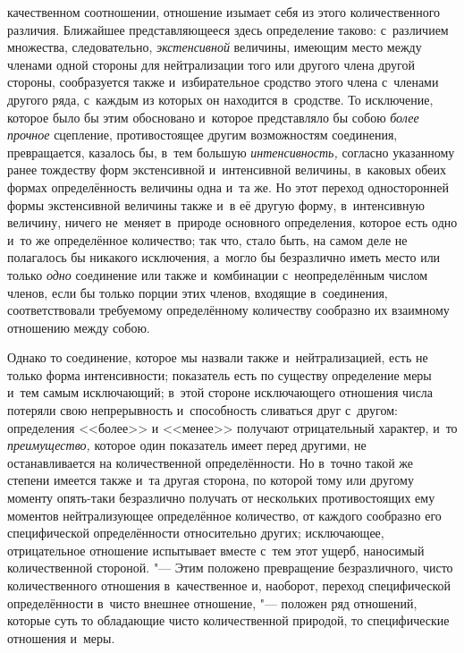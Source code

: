 качественном соотношении, отношение изымает себя из этого количественного
различия. Ближайшее представляющееся здесь определение таково: с~различием
множества, следовательно, {\em экстенсивной} величины, имеющим место между
членами одной стороны для нейтрализации того или другого члена другой стороны,
сообразуется также и~избирательное сродство этого члена с~членами другого ряда,
с~каждым из которых он находится в~сродстве. То исключение, которое было бы
этим обосновано и~которое представляло бы собою {\em более прочное} сцепление,
противостоящее другим возможностям соединения, превращается, казалось бы, в~тем
большую {\em интенсивность,} согласно указанному ранее тождеству форм
экстенсивной и~интенсивной величины, в~каковых обеих формах определённость
величины одна и~та же. Но этот переход односторонней формы экстенсивной
величины также и~в её другую форму, в~интенсивную величину, ничего не~меняет
в~природе основного определения, которое есть одно и~то же определённое
количество; так что, стало быть, на самом деле не полагалось бы никакого
исключения, а~могло бы безразлично иметь место или только {\em одно} соединение
или также и~комбинации с~неопределённым числом членов, если бы только порции
этих членов, входящие в~соединения, соответствовали требуемому определённому
количеству сообразно их взаимному отношению между собою.

Однако то соединение, которое мы назвали также и~нейтрализацией, есть не только
форма интенсивности; показатель есть по существу определение меры и~тем самым
исключающий; в~этой стороне исключающего отношения числа потеряли свою
непрерывность и~способность сливаться друг с~другом: определения <<более>> и
<<менее>> получают отрицательный характер, и~то {\em преимущество,} которое
один показатель имеет перед другими, не останавливается на количественной
определённости. Но в~точно такой же степени имеется также и~та другая сторона,
по которой тому или другому моменту опять-таки безразлично получать от
нескольких противостоящих ему моментов нейтрализующее определённое количество,
от каждого сообразно его специфической определённости относительно других;
исключающее, отрицательное отношение испытывает вместе с~тем этот ущерб,
наносимый количественной стороной. "--- Этим положено превращение
безразличного, чисто количественного отношения в~качественное и, наоборот,
переход специфической определённости в~чисто внешнее отношение, "--- положен
ряд отношений, которые суть то обладающие чисто количественной природой, то
специфические отношения и~меры.


